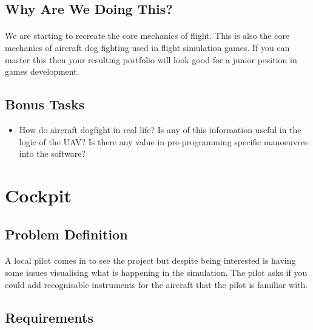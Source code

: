 \documentclass[11pt]{book}
\begin{document}
\subsection{Why Are We Doing This?}

\paragraph{} We are starting to recreate the core mechanics of flight. This is also the core mechanics of aircraft dog fighting used in flight simulation games. If you can master this then your resulting portfolio will look good for a junior position in games development.

\paragraph{}
\subsection{Bonus Tasks}
\begin{itemize}
\item How do aircraft dogfight in real life? Is any of this information useful in the logic of the UAV? Is there any value in pre-programming specific manoeuvres into the software?
\end{itemize}

\clearpage

\section{Cockpit}

\subsection{Problem Definition}

\paragraph{} A local pilot comes in to see the project but despite being interested is having some issues visualising what is happening in the simulation. The pilot asks if you could add recognisable instruments for the aircraft that the pilot is familiar with.

\subsection{Requirements}
\end{document}
